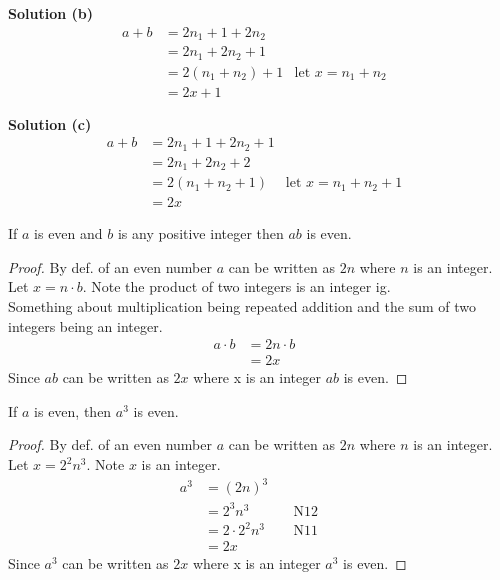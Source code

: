 \textbf{Solution (b)}
\begin{align*}
a + b &= 2n_1 + 1 + 2n_2 & \\
&= 2n_1 + 2n_2 + 1 & \\
&= 2(n_1 + n_2) + 1 & \text{let } x = n_1 + n_2 & \\
&= 2x + 1
\end{align*}

\textbf{Solution (c)}
\begin{align*}
a + b &= 2n_1 + 1 + 2n_2 + 1 & \\
&= 2n_1 + 2n_2 + 2 & \\
&= 2(n_1 + n_2 + 1) & \text{let } x = n_1 + n_2 + 1 & \\
&= 2x
\end{align*}


\begin{tcolorbox}[title=Problem 2, breakable]
If $a$ is even and $b$ is any positive integer then $ab$ is even.
\end{tcolorbox}

\begin{proof}
By def. of an even number $a$ can be written as $2n$ where $n$ is an integer. \\
Let $x = n \cdot b$. Note the product of two integers is an integer ig. \\ 
Something about multiplication being repeated addition and the sum of two integers being an integer.
\begin{align*}
    a \cdot b &= 2n \cdot b & \\
    &= 2x & 
\end{align*}
Since $ab$ can be written as $2x$ where x is an integer $ab$ is even.
\end{proof}

\begin{tcolorbox}[title=Problem 3, breakable]
If $a$ is even, then $a^3$ is even.
\end{tcolorbox}

\begin{proof}
By def. of an even number $a$ can be written as $2n$ where $n$ is an integer. \\
Let $x = 2^2 n^3$. Note $x$ is an integer. 
\begin{align*}
a^3 &= {(2n)}^3 & \quad \text{} && \\
&= 2^3 n^3 & \quad \text{N12} && \\
&= 2 \cdot 2^2 n^3 & \quad \text{N11} && \\
&= 2 x & \quad \text{}
\end{align*}
Since $a^3$ can be written as $2x$ where x is an integer $a^3$ is even.
\end{proof}

